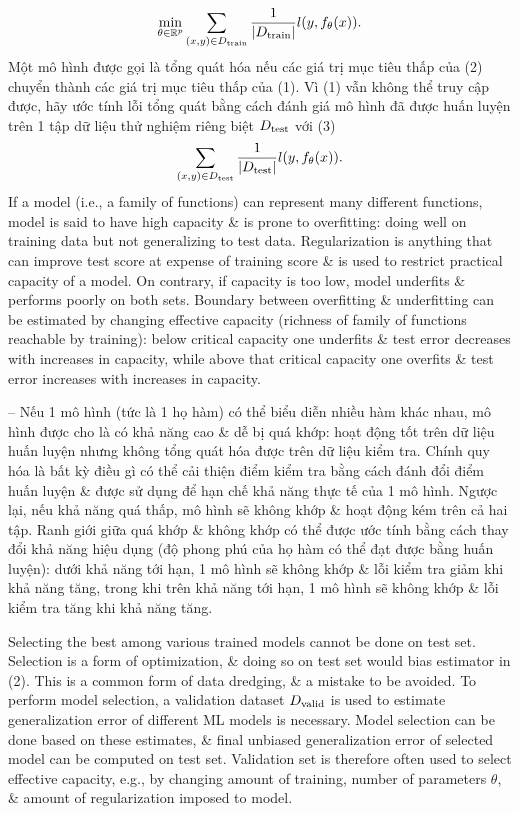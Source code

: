 \documentclass{article}
\begin{document}
\begin{itemize}
\begin{itemize}
\begin{itemize}
            \begin{equation*}
                \min_{\theta\in\mathbb{R}^p}\sum_{(x,y)\in D_{\rm train}} \frac{1}{|D_{\rm train}|}l(y,f_\theta(x)).
            \end{equation*}
            Một mô hình được gọi là tổng quát hóa nếu các giá trị mục tiêu thấp của (2) chuyển thành các giá trị mục tiêu thấp của (1). Vì (1) vẫn không thể truy cập được, hãy ước tính lỗi tổng quát bằng cách đánh giá mô hình đã được huấn luyện trên 1 tập dữ liệu thử nghiệm riêng biệt $D_{\rm test}$ với (3)
            \begin{equation*}
                \sum_{(x,y)\in D_{\rm test}} \frac{1}{|D_{\rm test}|}l(y,f_\theta(x)).
            \end{equation*}
            If a model (i.e., a family of functions) can represent many different functions, model is said to have high capacity \& is prone to overfitting: doing well on training data but not generalizing to test data. Regularization is anything that can improve test score at expense of training score \& is used to restrict practical capacity of a model. On contrary, if capacity is too low, model underfits \& performs poorly on both sets. Boundary between overfitting \& underfitting can be estimated by changing effective capacity (richness of family of functions reachable by training): below critical capacity one underfits \& test error decreases with increases in capacity, while above that critical capacity one overfits \& test error increases with increases in capacity.

            -- Nếu 1 mô hình (tức là 1 họ hàm) có thể biểu diễn nhiều hàm khác nhau, mô hình được cho là có khả năng cao \& dễ bị quá khớp: hoạt động tốt trên dữ liệu huấn luyện nhưng không tổng quát hóa được trên dữ liệu kiểm tra. Chính quy hóa là bất kỳ điều gì có thể cải thiện điểm kiểm tra bằng cách đánh đổi điểm huấn luyện \& được sử dụng để hạn chế khả năng thực tế của 1 mô hình. Ngược lại, nếu khả năng quá thấp, mô hình sẽ không khớp \& hoạt động kém trên cả hai tập. Ranh giới giữa quá khớp \& không khớp có thể được ước tính bằng cách thay đổi khả năng hiệu dụng (độ phong phú của họ hàm có thể đạt được bằng huấn luyện): dưới khả năng tới hạn, 1 mô hình sẽ không khớp \& lỗi kiểm tra giảm khi khả năng tăng, trong khi trên khả năng tới hạn, 1 mô hình sẽ không khớp \& lỗi kiểm tra tăng khi khả năng tăng.

            Selecting the best among various trained models cannot be done on test set. Selection is a form of optimization, \& doing so on test set would bias estimator in (2). This is a common form of data dredging, \& a mistake to be avoided. To perform model selection, a validation dataset $D_{\rm valid}$ is used to estimate generalization error of different ML models is necessary. Model selection can be done based on these estimates, \& final unbiased generalization error of selected model can be computed on test set. Validation set is therefore often used to select effective capacity, e.g., by changing amount of training, number of parameters $\theta$, \& amount of regularization imposed to model.


\end{itemize}
\end{itemize}
\end{itemize}
\end{document}
